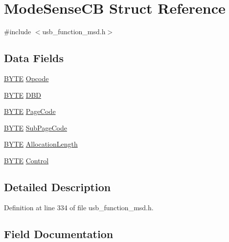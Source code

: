 \hypertarget{struct_mode_sense_c_b}{}\section{Mode\+Sense\+C\+B Struct Reference}
\label{struct_mode_sense_c_b}


{\ttfamily \#include $<$usb\+\_\+function\+\_\+msd.\+h$>$}

\subsection*{Data Fields}
\begin{DoxyCompactItemize}
\item 
\hyperlink{_generic_type_defs_8h_a4ae1dab0fb4b072a66584546209e7d58}{B\+Y\+T\+E} \hyperlink{struct_mode_sense_c_b_a3ac7536b907732d60214ae553910eed9}{Opcode}
\item 
\hyperlink{_generic_type_defs_8h_a4ae1dab0fb4b072a66584546209e7d58}{B\+Y\+T\+E} \hyperlink{struct_mode_sense_c_b_a41546dd3008b70b9cef1ab0dfbca1584}{D\+B\+D}
\item 
\hyperlink{_generic_type_defs_8h_a4ae1dab0fb4b072a66584546209e7d58}{B\+Y\+T\+E} \hyperlink{struct_mode_sense_c_b_a53ee9769775f645af63931eb0fef7922}{Page\+Code}
\item 
\hyperlink{_generic_type_defs_8h_a4ae1dab0fb4b072a66584546209e7d58}{B\+Y\+T\+E} \hyperlink{struct_mode_sense_c_b_a1d8ac6eaafe18f9d665d97448add7bdc}{Sub\+Page\+Code}
\item 
\hyperlink{_generic_type_defs_8h_a4ae1dab0fb4b072a66584546209e7d58}{B\+Y\+T\+E} \hyperlink{struct_mode_sense_c_b_a8c0a66f23ee960de672d690626364354}{Allocation\+Length}
\item 
\hyperlink{_generic_type_defs_8h_a4ae1dab0fb4b072a66584546209e7d58}{B\+Y\+T\+E} \hyperlink{struct_mode_sense_c_b_a5dc24656c27deb12af74c98930f0bfc5}{Control}
\end{DoxyCompactItemize}


\subsection{Detailed Description}


Definition at line 334 of file usb\+\_\+function\+\_\+msd.\+h.



\subsection{Field Documentation}
\hypertarget{struct_mode_sense_c_b_a8c0a66f23ee960de672d690626364354}{}
